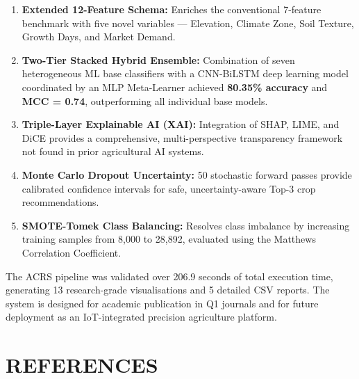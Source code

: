 \documentclass[12pt,a4paper,oneside]{report}
\begin{document}
\begin{enumerate}[leftmargin=*, label=\arabic*.]
  \item \textbf{Extended 12-Feature Schema:} Enriches the conventional 7-feature benchmark with five novel variables --- Elevation, Climate Zone, Soil Texture, Growth Days, and Market Demand.

  \item \textbf{Two-Tier Stacked Hybrid Ensemble:} Combination of seven heterogeneous ML base classifiers with a CNN-BiLSTM deep learning model coordinated by an MLP Meta-Learner achieved \textbf{80.35\% accuracy} and \textbf{MCC = 0.74}, outperforming all individual base models.

  \item \textbf{Triple-Layer Explainable AI (XAI):} Integration of SHAP, LIME, and DiCE provides a comprehensive, multi-perspective transparency framework not found in prior agricultural AI systems.

  \item \textbf{Monte Carlo Dropout Uncertainty:} 50 stochastic forward passes provide calibrated confidence intervals for safe, uncertainty-aware Top-3 crop recommendations.

  \item \textbf{SMOTE-Tomek Class Balancing:} Resolves class imbalance by increasing training samples from 8,000 to 28,892, evaluated using the Matthews Correlation Coefficient.
\end{enumerate}

The ACRS pipeline was validated over 206.9 seconds of total execution time, generating 13 research-grade visualisations and 5 detailed CSV reports. The system is designed for academic publication in Q1 journals and for future deployment as an IoT-integrated precision agriculture platform.

\chapter*{REFERENCES}
\end{document}
